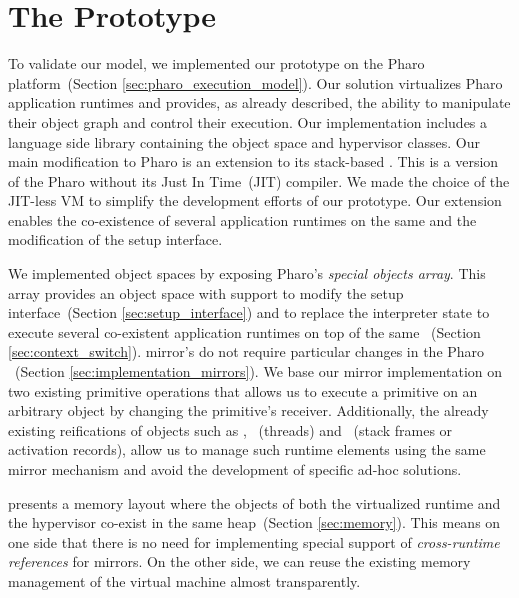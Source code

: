 
\chapter{The \Vtt Prototype}
\minitoc
{}
\introduction

To validate our model, we implemented our \Vtt prototype on the Pharo platform~(Section \ref{sec:pharo_execution_model}). Our solution virtualizes Pharo application runtimes and provides, as already described, the ability to manipulate their object graph and control their execution. Our implementation includes a language side library containing the object space and hypervisor classes. Our main modification to Pharo is an extension to its stack-based \VM. This \VM is a version of the Pharo \VM without its Just In Time~(JIT) compiler. We made the choice of the JIT-less VM to simplify the development efforts of our prototype. Our extension enables the co-existence of several application runtimes on the same \VM and the modification of the \VM setup interface.

We implemented object spaces by exposing Pharo's \emph{special objects array}. This array provides an object space with support to modify the \VM setup interface~(Section \ref{sec:setup_interface}) and to replace the \VM interpreter state to execute several co-existent application runtimes on top of the same \VM~(Section \ref{sec:context_switch}). \Vtt mirror's do not require particular changes in the Pharo \VM~(Section \ref{sec:implementation_mirrors}). We base our mirror implementation on two existing \VM primitive operations that allows us to execute a primitive on an arbitrary object by changing the primitive's receiver. Additionally, the already existing reifications of objects such as , ~(threads) and ~(stack frames or activation records), allow us to manage such runtime elements using the same mirror mechanism and avoid the development of specific ad-hoc solutions.

\Vtt presents a memory layout where the objects of both the virtualized runtime and the hypervisor co-exist in the same heap~(Section \ref{sec:memory}). This means on one side that there is no need for implementing special support of \emph{cross-runtime references} for mirrors. On the other side, we can reuse the existing memory management of the virtual machine almost transparently.

